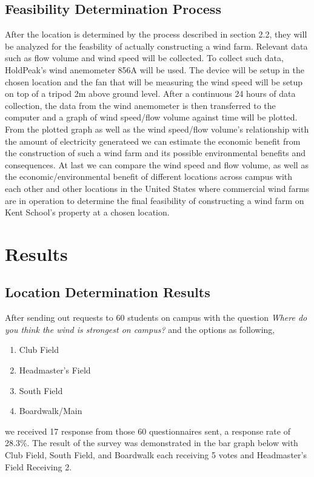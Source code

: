 \documentclass[review]{elsarticle}
\begin{document}
\subsection{Feasibility Determination Process}
After the location is determined by the process described in section 2.2, they will be analyzed for the feasbility of actually constructing a wind farm. Relevant data such as flow volume and wind speed will be collected. To collect such data, HoldPeak's wind anemometer 856A will be used. The device will be setup in the chosen location and the fan that will be measuring the wind speed
 will be setup on top of a tripod 2m above ground level. After a continuous 24 hours of data collection, the data from the wind anemometer is then transferred to the computer and a graph of wind speed/flow volume against time will be plotted.
 \\\indent From the plotted graph as well as the wind speed/flow volume's relationship with the amount of electricity generateed we can estimate the economic benefit from the construction of such a wind farm and its possible environmental benefits and consequences. 
 At last we can compare the wind speed and flow volume, as well as the economic/environmental benefit of different locations across campus with each other and other locations in the United States where commercial wind farms are in operation to determine the final feasibility of constructing a wind farm on Kent School's property at a chosen location.

\section{Results}
\subsection{Location Determination Results}
After sending out requests to 60 students on campus with the question \textit{Where do you think the wind is strongest on campus?} and the options as following,
\begin{enumerate}
    \item {Club Field}
    \item {Headmaster's Field}
    \item {South Field}
    \item {Boardwalk/Main}   
\end{enumerate}
we received 17 response from those 60 questionnaires sent, a response rate of 28.3\%. The result of the survey was demonstrated in the bar graph below with Club Field, South Field, and Boardwalk each receiving 5 votes and Headmaster's Field Receiving 2. 
\end{document}
